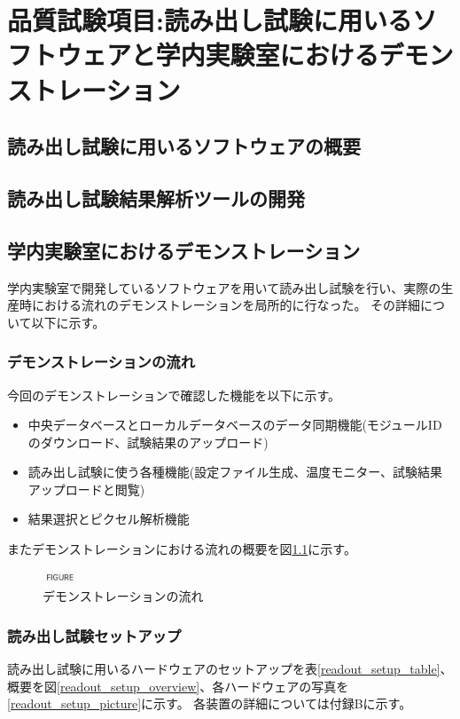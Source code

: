 \chapter{品質試験項目:読み出し試験に用いるソフトウェアと学内実験室におけるデモンストレーション}

\section{読み出し試験に用いるソフトウェアの概要}

\section{読み出し試験結果解析ツールの開発}

\section{学内実験室におけるデモンストレーション}
学内実験室で開発しているソフトウェアを用いて読み出し試験を行い、実際の生産時における流れのデモンストレーションを局所的に行なった。
その詳細について以下に示す。

\subsection{デモンストレーションの流れ}

今回のデモンストレーションで確認した機能を以下に示す。
\begin{itemize}
  \item 中央データベースとローカルデータベースのデータ同期機能(モジュールIDのダウンロード、試験結果のアップロード)
  \item 読み出し試験に使う各種機能(設定ファイル生成、温度モニター、試験結果アップロードと閲覧)
  \item 結果選択とピクセル解析機能
\end{itemize}

またデモンストレーションにおける流れの概要を図\ref{demo_flow}に示す。

\begin{figure}[bpt]\centering
\includegraphics[width=1cm]{figure}
\caption[デモンストレーションの流れ]{デモンストレーションの流れ}
\label{demo_flow}
\end{figure}

\subsection{読み出し試験セットアップ}
読み出し試験に用いるハードウェアのセットアップを表\ref{readout_setup_table}、概要を図\ref{readout_setup_overview}、各ハードウェアの写真を\ref{readout_setup_picture}に示す。
各装置の詳細については付録Bに示す。

